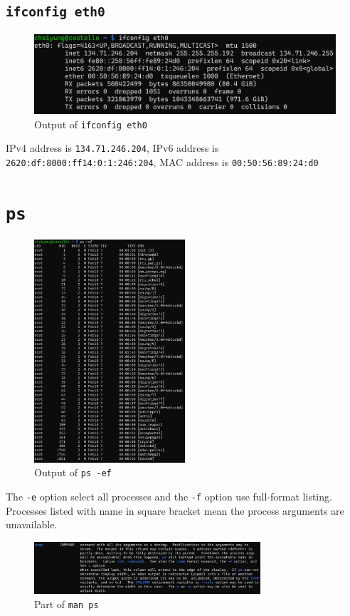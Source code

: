 \documentclass{article}
\begin{document}
\subsection{\texttt{ifconfig eth0}}
\begin{figure}[H]
  \caption{Output of \texttt{ifconfig eth0}}
  \centering
  \includegraphics[width=\textwidth]{ECE4310_proj1_part1_6.png}
\end{figure}
IPv4 address is \texttt{134.71.246.204}, IPv6 address is \texttt{2620:df:8000:ff14:0:1:246:204}, MAC address is \texttt{00:50:56:89:24:d0}

\section{\texttt{ps}}
\begin{figure}[H]
  \caption{Output of \texttt{ps -ef}}
  \centering
  \includegraphics[width=0.5\textwidth]{ECE4310_proj1_part2_ef.png}
\end{figure}
The \texttt{-e} option select all processes and the \texttt{-f} option use full-format listing.
Processes listed with name in square bracket mean the process arguments are unavailable.
\begin{figure}[H]
  \caption{Part of \texttt{man ps}}
  \centering
  \includegraphics[width=0.75\textwidth]{ECE4310_proj1_part2_bracket.png}
\end{figure}
\end{document}
